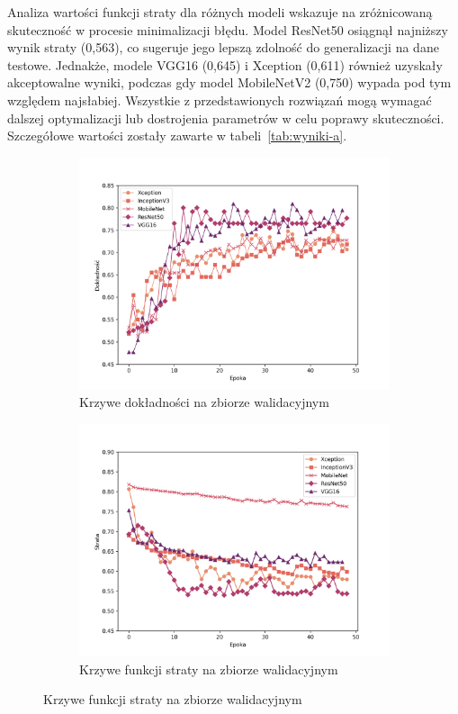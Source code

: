 Analiza wartości funkcji straty dla różnych modeli wskazuje na zróżnicowaną skuteczność w procesie minimalizacji błędu.
Model ResNet50 osiągnął najniższy wynik straty (0,563), co sugeruje jego lepszą zdolność do generalizacji na dane testowe.
Jednakże, modele VGG16 (0,645) i Xception (0,611) również uzyskały akceptowalne wyniki, podczas gdy model MobileNetV2 (0,750) wypada pod tym względem najsłabiej.
Wszystkie z przedstawionych rozwiązań mogą wymagać dalszej optymalizacji lub dostrojenia parametrów w celu poprawy skuteczności.
Szczegółowe wartości zostały zawarte w tabeli~\ref{tab:wyniki-a}.

\begin{figure}[ht]
    \centering
    \begin{subfigure}{0.49\textwidth}
        \centering
        \includegraphics[width=\textwidth]{./img/results/a_acc}
        \caption{Krzywe dokładności na zbiorze walidacyjnym\@}
        \label{fig:a_acc}
    \end{subfigure}
    \begin{subfigure}{0.49\textwidth}
        \centering
        \includegraphics[width=\textwidth]{./img/results/a_loss}
        \caption{Krzywe funkcji straty na zbiorze walidacyjnym\@}
        \label{fig:a_loss}
    \end{subfigure}


\end{figure}
